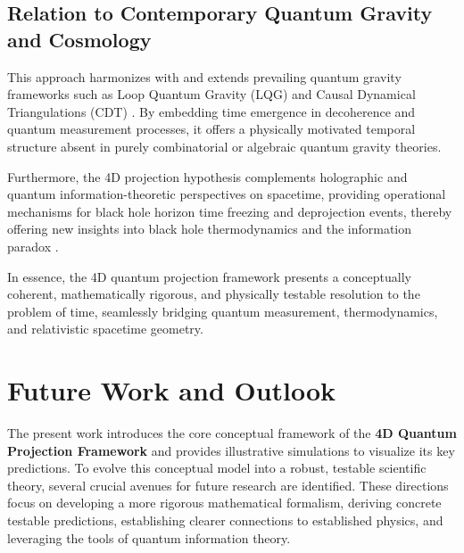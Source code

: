 \documentclass[12pt,a4paper]{article}
\numberwithin{equation}{section}
\begin{document}
\subsection{Relation to Contemporary Quantum Gravity and Cosmology}

This approach harmonizes with and extends prevailing quantum gravity frameworks such as Loop Quantum Gravity (LQG) \cite{rovelli_quantum_2004} and Causal Dynamical Triangulations (CDT) \cite{ambjorn_causal_2005}. By embedding time emergence in decoherence and quantum measurement processes, it offers a physically motivated temporal structure absent in purely combinatorial or algebraic quantum gravity theories.

Furthermore, the 4D projection hypothesis complements holographic and quantum information-theoretic perspectives on spacetime, providing operational mechanisms for black hole horizon time freezing and deprojection events, thereby offering new insights into black hole thermodynamics and the information paradox \cite{bousso_holographic_2002, hawking_particle_1975, preskill_black_1992}.

In essence, the 4D quantum projection framework presents a conceptually coherent, mathematically rigorous, and physically testable resolution to the problem of time, seamlessly bridging quantum measurement, thermodynamics, and relativistic spacetime geometry.

\section{Future Work and Outlook}
\label{sec:future_work}

The present work introduces the core conceptual framework of the \textbf{4D Quantum Projection Framework} and provides illustrative simulations to visualize its key predictions. To evolve this conceptual model into a robust, testable scientific theory, several crucial avenues for future research are identified. These directions focus on developing a more rigorous mathematical formalism, deriving concrete testable predictions, establishing clearer connections to established physics, and leveraging the tools of quantum information theory.
\end{document}
